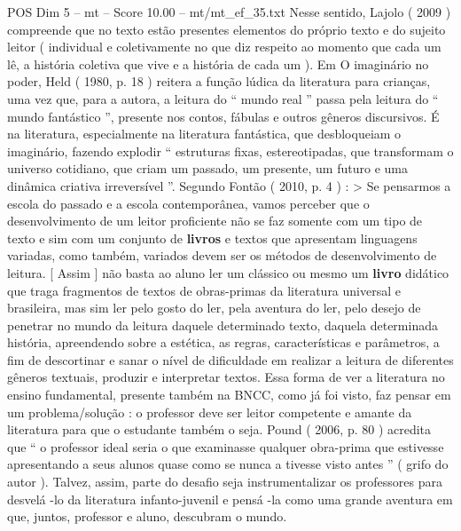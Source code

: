 \begin{textsample}{POS Dim 5 – mt – Score 10.00 – mt/mt\_ef\_35.txt}
Nesse sentido, Lajolo ( 2009 ) compreende que no texto estão presentes elementos do próprio texto e do sujeito leitor ( individual e coletivamente no que diz respeito ao momento que cada um lê, a história coletiva que vive e a história de cada um ).
Em O imaginário no poder, Held ( 1980, p. 18 ) reitera a função lúdica da literatura para crianças, uma vez que, para a autora, a leitura do “ mundo real ” passa pela leitura do “ mundo fantástico ”, presente nos contos, fábulas e outros gêneros discursivos.
É na literatura, especialmente na literatura fantástica, que desbloqueiam o imaginário, fazendo explodir “ estruturas fixas, estereotipadas, que transformam o universo cotidiano, que criam um passado, um presente, um futuro e uma dinâmica criativa irreversível ”.
Segundo Fontão ( 2010, p. 4 ) : > Se pensarmos a escola do passado e a escola contemporânea, vamos perceber que o desenvolvimento de um leitor proficiente não se faz somente com um tipo de texto e sim com um conjunto de \textbf{livros} e textos que apresentam linguagens variadas, como também, variados devem ser os métodos de desenvolvimento de leitura. [ Assim ] não basta ao aluno ler um clássico ou mesmo um \textbf{livro} didático que traga fragmentos de textos de obras-primas da literatura universal e brasileira, mas sim ler pelo gosto do ler, pela aventura do ler, pelo desejo de penetrar no mundo da leitura daquele determinado texto, daquela determinada história, apreendendo sobre a estética, as regras, características e parâmetros, a fim de descortinar e sanar o nível de dificuldade em realizar a leitura de diferentes gêneros textuais, produzir e interpretar textos.
Essa forma de ver a literatura no ensino fundamental, presente também na BNCC, como já foi visto, faz pensar em um problema/solução : o professor deve ser leitor competente e amante da literatura para que o estudante também o seja.
Pound ( 2006, p. 80 ) acredita que “ o professor ideal seria o que examinasse qualquer obra-prima que estivesse apresentando a seus alunos quase como se nunca a tivesse visto antes ” ( grifo do autor ).
Talvez, assim, parte do desafio seja instrumentalizar os professores para desvelá -lo da literatura infanto-juvenil e pensá -la como uma grande aventura em que, juntos, professor e aluno, descubram o mundo.

\end{textsample}
